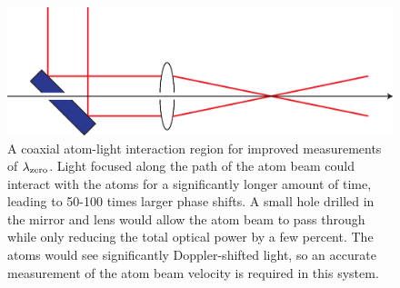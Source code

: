 \begin{figure}
\centerline{\includegraphics[width=.90\textwidth]{Figures/holeyMirror.eps}}
\caption[A coaxial atom-light interaction region for improved measurements of $\lambdaZero$.]{\label{mzwHoleyMirror}A coaxial atom-light interaction region for improved measurements of $\lambdaZero$. Light focused along the path of the atom beam could interact with the atoms for a significantly longer amount of time, leading to 50-100 times larger phase shifts. A small hole drilled in the mirror and lens would allow the atom beam to pass through while only reducing the total optical power by a few percent. The atoms would see significantly Doppler-shifted light, so an accurate measurement of the atom beam velocity is required in this system.}
\end{figure}


